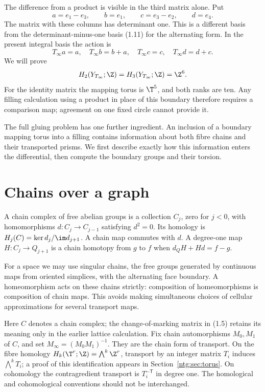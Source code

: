 The difference from a product is visible in the third matrix alone.
Put
\begin{equation}\label{ntg:eq:shear-basis}
 a=e_1-e_3,\qquad b=e_1,\qquad c=e_3-e_2,\qquad d=e_4.
\end{equation}
The matrix with these columns has determinant one. This is a different
basis from the determinant-minus-one basis (1.11) for the alternating
form. In the present integral basis the action is
\begin{equation}\label{ntg:eq:shear}
 T_\infty a=a,\quad T_\infty b=b+a,\quad
 T_\infty c=c,\quad T_\infty d=d+c.
\end{equation}
We will prove
\[
 H_2(Y_{T_\infty};\Z)=H_3(Y_{T_\infty};\Z)=\Z^6.
\]
For the identity matrix the mapping torus is $\T^5$, and both ranks
are ten. Any filling calculation using a product in place of this
boundary therefore requires a comparison map; agreement on one fixed
circle cannot provide it.

The full gluing problem has one further ingredient. An inclusion of a
boundary mapping torus into a filling contains information about both
fibre chains and their transported prisms. We first describe exactly
how this information enters the differential, then compute the boundary
groups and their torsion.

\section{Chains over a graph}

A chain complex of free abelian groups is a collection $C_j$, zero
for $j<0$, with homomorphisms $d:C_j\to C_{j-1}$ satisfying $d^2=0$.
Its homology is $H_j(C)=\ker d_j/\im d_{j+1}$. A chain map commutes
with $d$. A degree-one map $H:C_j\to Q_{j+1}$ is a chain homotopy
from $g$ to $f$ when $d_QH+Hd=f-g$.

For a space we may use singular chains, the free groups generated by
continuous maps from oriented simplices, with the alternating face
boundary. A homeomorphism acts on these chains strictly: composition
of homeomorphisms is composition of chain maps. This avoids making
simultaneous choices of cellular approximations for several transport
maps.

Here $C$ denotes a chain complex; the change-of-marking matrix in
(1.5) retains its meaning only in the earlier lattice calculation.
Fix chain automorphisms $M_0,M_1$ of $C$, and set
$M_\infty=(M_0M_1)^{-1}$. They are the chain form of transport.
On the fibre homology $H_k(\T^r;\Z)=\bigwedge^k\Z^r$, transport by
an integer matrix $T_i$ induces $\bigwedge^kT_i$; a proof of this
identification appears in Section~\ref{ntg:sec:torus}. On cohomology the
contragredient transport is $T_i^{-\mathsf T}$ in degree one. The
homological and cohomological conventions should not be interchanged.

